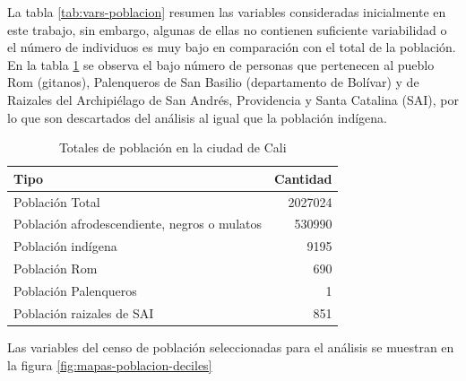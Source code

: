 \documentclass[12pt,]{book}
\begin{document}
La tabla \ref{tab:vars-poblacion} resumen las variables consideradas
inicialmente en este trabajo, sin embargo, algunas de ellas no contienen
suficiente variabilidad o el número de individuos es muy bajo en
comparación con el total de la población. En la tabla
\ref{tab:totales-poblacion} se observa el bajo número de personas que
pertenecen al pueblo Rom (gitanos), Palenqueros de San Basilio
(departamento de Bolívar) y de Raizales del Archipiélago de San Andrés,
Providencia y Santa Catalina (SAI), por lo que son descartados del
análisis al igual que la población indígena.

\begin{table}

\caption{\label{tab:totales-poblacion}Totales de población en la ciudad de Cali}
\centering
\begin{tabular}[t]{l|r}
\hline
Tipo & Cantidad\\
\hline
Población Total & 2027024\\
\hline
Población afrodescendiente, negros o mulatos & 530990\\
\hline
Población indígena & 9195\\
\hline
Población Rom & 690\\
\hline
Población Palenqueros & 1\\
\hline
Población raizales de SAI & 851\\
\hline
\end{tabular}
\end{table}

Las variables del censo de población seleccionadas para el análisis se
muestran en la figura \ref{fig:mapas-poblacion-deciles}
\end{document}
